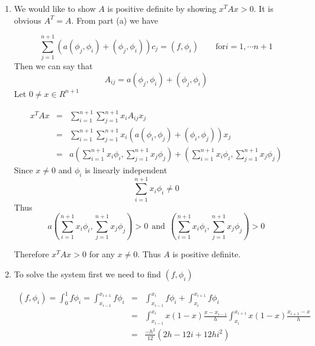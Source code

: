 {\begin{solution}
\begin{enumerate}
Therefore

\[
M= \left[\begin{array}{rrrrrrr}
              \frac{2h}{3} &  \frac{h}{6} & 0 & 0 &  \cdots & 0 \\[0.25em]
               \frac{h}{6}  & \frac{2h}{3} & \frac{h}{6} &0 & \cdots & 0 \\
                0& \frac{h}{6} & \frac{2h}{3} & \frac{h}{6} & \cdots & 0\\
                 \vdots & & &\ddots &  & \vdots \\[0.25em]
                 0 & \cdots &  & \frac{h}{6}& \frac{2h}{3} & \frac{h}{6} \\ 
                 0 & &\cdots &  & \frac{h}{6} & \frac{h}{3} 
                   \end{array}\right]
                   \] 


\item We would like to show $A$ is positive definite by showing $x^T A x > 0$. It is obvious $A^T = A$. From part (a) we  have 

\[ \sum_{j=1}^{n+1}\left( a( \phi_j, \phi_i) + (\phi_j, \phi_i)\right) c_j   = (f,\phi_i) \qquad \mbox{for} i=1, \cdots n+1\]
Then  we can say that 
\[
A_{ij}= a( \phi_j, \phi_i) + (\phi_j, \phi_i)
\]
Let $0 \neq x \in R^{n+1}$ 

\begin{eqnarray*}
x^T A x&=& \sum_{i=1}^{n+1} \sum_{j=1}^{n+1} x_i A_{ij}  x_j\\
			 &=& \sum_{i=1}^{n+1} \sum_{j=1}^{n+1}  x_i (a( \phi_i, \phi_j) + (\phi_i, \phi_j)) x_j \\
			 &=& a( \sum_{i=1}^{n+1} x_i\phi_i, \sum_{j=1}^{n+1} x_j\phi_j) + ( \sum_{i=1}^{n+1} x_i\phi_i, \sum_{j=1}^{n+1} x_j\phi_j)
\end{eqnarray*}
Since $x\neq 0 $ and $\phi_i$ is linearly independent 
\[
\sum_{i=1}^{n+1} x_i\phi_i \neq 0
\] 
Thus
 \[
 a( \sum_{i=1}^{n+1} x_i\phi_i, \sum_{j=1}^{n+1} x_j\phi_j) > 0 \:\: \mbox{and} \:\:( \sum_{i=1}^{n+1} x_i\phi_i, \sum_{j=1}^{n+1}  x_j\phi_j) > 0 
 \]

Therefore $ x^T A x >0 $ for any $x\neq 0 $. Thus $A$  is positive definite. 

\item To solve the system first we need to find $(f, \phi_i)$

\begin{eqnarray*}
(f,\phi_i)= \int_0^1 f \phi_i = \int_{x_{i-1}}^{x_{i+1}} f \phi_i &=& \int_{x_{i-1}}^{x_i} f \phi_i + \int_{x_{i}}^{x_{i+1}} f \phi_i\\
																														      	&=& \int_{x_{i-1}}^{x_i} x(1-x) \frac{x-x_{i-1}}{h} \int_{x_i}^{x_{i+1}} x(1-x) \frac{x_{i+1}-x}{h}\\
																																	&=&\frac{-h^2}{12}(2h - 12 i + 12 h i^2)
\end{eqnarray*}


\end{enumerate}
\end{solution}}
